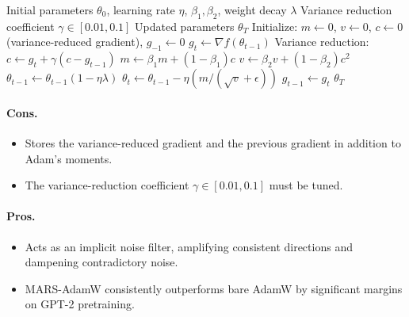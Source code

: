 \begin{algorithm}[H]
\caption{MARS (Make Adaptive learning Rates Shine)}
\label{alg:mars}
\begin{algorithmic}[1]
\Require Initial parameters $\theta_0$, learning rate $\eta$, $\beta_1, \beta_2$, weight decay $\lambda$
\Require Variance reduction coefficient $\gamma \in [0.01, 0.1]$
\Ensure Updated parameters $\theta_T$
\State Initialize: $m \gets 0$, $v \gets 0$, $c \gets 0$ (variance-reduced gradient), $g_{-1} \gets 0$
    \State $g_t \gets \nabla f(\theta_{t-1})$
    \State Variance reduction: $c \gets g_t + \gamma(c - g_{t-1})$
    \State $m \gets \beta_1 m + (1-\beta_1) c$
    \State $v \gets \beta_2 v + (1-\beta_2) c^2$
        \State $\theta_{t-1} \gets \theta_{t-1}(1 - \eta\lambda)$
    \EndIf
    \State $\theta_t \gets \theta_{t-1} - \eta (m / (\sqrt{v} + \epsilon))$
    \State $g_{t-1} \gets g_t$
\EndFor
\Return $\theta_T$
\end{algorithmic}
\end{algorithm}

\paragraph{Cons.}
\begin{itemize}[leftmargin=*]
\item Stores the variance-reduced gradient and the previous gradient in addition to Adam's moments.
\item The variance-reduction coefficient $\gamma \in [0.01, 0.1]$ must be tuned.
\end{itemize}

\paragraph{Pros.}
\begin{itemize}[leftmargin=*]
\item Acts as an implicit noise filter, amplifying consistent directions and dampening contradictory noise.
\item MARS-AdamW consistently outperforms bare AdamW by significant margins on GPT-2 pretraining.
\end{itemize}

